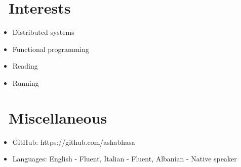 \documentclass{resume}
\begin{document}
\section{\faHeartO\ Interests}
\begin{itemize}[parsep=0.5ex]
  \item Distributed systems
  \item Functional programming
  \item Reading
  \item Running
\end{itemize}

\section{\faInfo\ Miscellaneous}
\begin{itemize}[parsep=0.5ex]
  \item GitHub: https://github.com/ashabhasa
  \item Languages: English - Fluent, Italian - Fluent, Albanian - Native speaker
\end{itemize}

%
%
\end{document}
